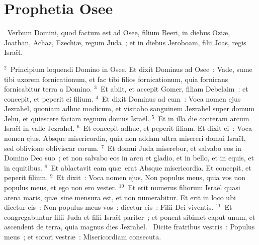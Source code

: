 \clearpage
{\centering \section*{Prophetia Osee}}\thispagestyle{empty}

~Verbum Domini, quod factum est ad Osee, filium Beeri, in diebus Ozi\ae , Joathan, Achaz, Ezechi\ae , regum Juda~; et in diebus Jeroboam, filii Joas, regis Isra\"el.


${}^{2}$~Principium loquendi Domino in Osee. Et dixit Dominus ad Osee~: Vade, sume tibi uxorem fornicationum, et fac tibi filios fornicationum, quia fornicans fornicabitur terra a Domino.
${}^{3}$~Et abiit, et accepit Gomer, filiam Debelaim~: et concepit, et peperit ei filium.
${}^{4}$~Et dixit Dominus ad eum~: Voca nomen ejus Jezrahel, quoniam adhuc modicum, et visitabo sanguinem Jezrahel super domum Jehu, et quiescere faciam regnum domus Isra\"el.
${}^{5}$~Et in illa die conteram arcum Isra\"el in valle Jezrahel.
${}^{6}$~Et concepit adhuc, et peperit filiam. Et dixit ei~: Voca nomen ejus, Absque misericordia, quia non addam ultra misereri domui Isra\"el, sed oblivione obliviscar eorum.
${}^{7}$~Et domui Juda miserebor, et salvabo eos in Domino Deo suo~; et non salvabo eos in arcu et gladio, et in bello, et in equis, et in equitibus.
${}^{8}$~Et ablactavit eam qu\ae\ erat Absque misericordia. Et concepit, et peperit filium.
${}^{9}$~Et dixit~: Voca nomen ejus, Non populus meus, quia vos non populus meus, et ego non ero vester.
${}^{10}$~Et erit numerus filiorum Isra\"el quasi arena maris, qu\ae\ sine mensura est, et non numerabitur. Et erit in loco ubi dicetur eis~: Non populus meus vos~: dicetur eis~: Filii Dei viventis.
${}^{11}$~Et congregabuntur filii Juda et filii Isra\"el pariter~; et ponent sibimet caput unum, et ascendent de terra, quia magnus dies Jezrahel.
~Dicite fratribus vestris~: Populus meus~; et sorori vestr\ae~: Misericordiam consecuta.


